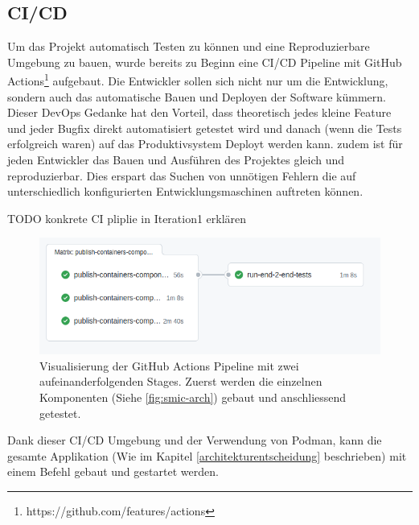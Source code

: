 \subsection{\ac{CI/CD}}

Um das Projekt automatisch Testen zu können und eine Reproduzierbare Umgebung zu bauen,
wurde bereits zu Beginn eine \ac{CI/CD} Pipeline mit GitHub Actions\footnote{https://github.com/features/actions}
aufgebaut.
Die Entwickler sollen sich nicht nur um die Entwicklung, sondern auch das automatische Bauen und Deployen der
Software kümmern. Dieser DevOps Gedanke hat den Vorteil, dass
theoretisch jedes kleine Feature und jeder Bugfix direkt automatisiert getestet
wird und danach (wenn die Tests erfolgreich waren) auf das Produktivsystem
Deployt werden kann. \cite{what_is_devops}
zudem ist für jeden Entwickler das Bauen und Ausführen des Projektes gleich und
reproduzierbar. Dies erspart das Suchen von unnötigen Fehlern die auf unterschiedlich
konfigurierten Entwicklungsmaschinen auftreten können.

TODO konkrete CI pliplie in Iteration1 erklären

\begin{figure}[h]
    \centering
    \includegraphics[width=1.0\textwidth]{gfx/ci-env}
    \caption{
        Visualisierung der GitHub Actions Pipeline mit zwei aufeinanderfolgenden Stages.
        Zuerst werden die einzelnen Komponenten (Siehe \ref{fig:smic-arch}) gebaut und
        anschliessend getestet.
    }
    \label{fig:ci-env}
\end{figure}

Dank dieser \ac{CI/CD} Umgebung und der Verwendung von Podman, kann die gesamte Applikation
(Wie im Kapitel \ref{architekturentscheidung} beschrieben) mit einem
Befehl gebaut und gestartet werden.